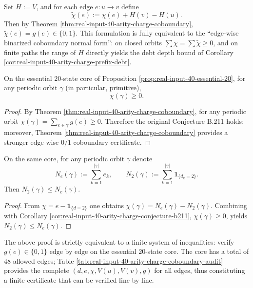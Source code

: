 \begin{remark}\label{rem:real-input-40-arity-charge-chi-tilde}
Set \(H:=V\), and for each edge \(e:u\to v\) define
\[
\widetilde\chi(e):=\chi(e)+H(v)-H(u).
\]
Then by Theorem \ref{thm:real-input-40-arity-charge-coboundary}, \(\widetilde\chi(e)=g(e)\in\{0,1\}\).
This formulation is fully equivalent to the ``edge-wise binarized coboundary normal form'': on closed orbits \(\sum\chi=\sum\widetilde\chi\ge 0\), and on finite paths the range of \(H\) directly yields the debt depth bound of Corollary \ref{cor:real-input-40-arity-charge-prefix-debt}.
\end{remark}

\begin{corollary}\label{cor:real-input-40-arity-charge-conjecture-b211}
On the essential $20$-state core of Proposition \ref{prop:real-input-40-essential-20}, for any periodic orbit \(\gamma\) (in particular, primitive),
\[
\chi(\gamma)\ge 0.
\]
\end{corollary}
\begin{proof}
By Theorem \ref{thm:real-input-40-arity-charge-coboundary}, for any periodic orbit \(\chi(\gamma)=\sum_{e\in\gamma}g(e)\ge 0\).
Therefore the original Conjecture B.211 holds; moreover, Theorem \ref{thm:real-input-40-arity-charge-coboundary} provides a stronger edge-wise \(0/1\) coboundary certificate.
\end{proof}

\begin{corollary}\label{cor:real-input-40-arity-charge-collision-le-output}
On the same core, for any periodic orbit \(\gamma\) denote
\[
N_e(\gamma):=\sum_{k=1}^{|\gamma|} e_k,
\qquad
N_2(\gamma):=\sum_{k=1}^{|\gamma|}\mathbf{1}_{\{d_k=2\}}.
\]
Then \(N_2(\gamma)\le N_e(\gamma)\).
\end{corollary}
\begin{proof}
From \(\chi=e-\mathbf{1}_{\{d=2\}}\) one obtains \(\chi(\gamma)=N_e(\gamma)-N_2(\gamma)\).
Combining with Corollary \ref{cor:real-input-40-arity-charge-conjecture-b211}, \(\chi(\gamma)\ge 0\), yields \(N_2(\gamma)\le N_e(\gamma)\).
\end{proof}

\begin{remark}\label{rem:real-input-40-arity-charge-coboundary-audit}
The above proof is strictly equivalent to a finite system of inequalities: verify $g(e)\in\{0,1\}$ edge by edge on the essential $20$-state core.
The core has a total of $48$ allowed edges; Table \ref{tab:real-input-40-arity-charge-coboundary-audit} provides the complete $(d,e,\chi,V(u),V(v),g)$ for all edges, thus constituting a finite certificate that can be verified line by line.
\end{remark}


